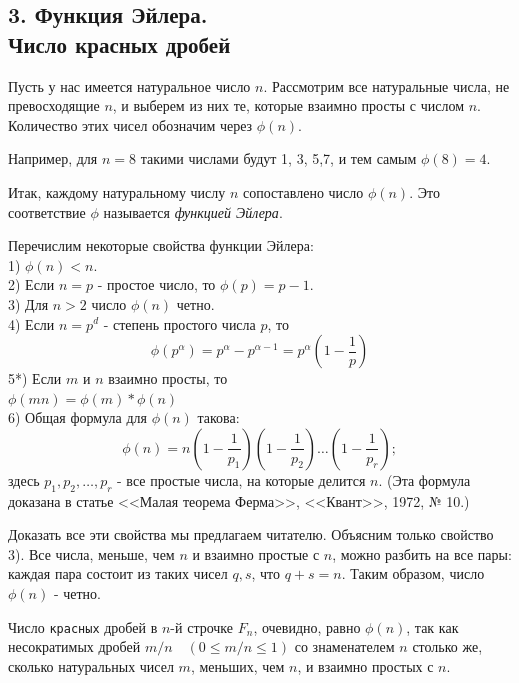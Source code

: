\begin{multicols*}{2}
\section*{3. Функция Эйлера.\\Число красных дробей}
{\large
Пусть у нас имеется натуральное число $n$. Рассмотрим все натуральные числа, не превосходящие $n$, и выберем из них те, которые взаимно просты с числом $n$. Количество этих чисел обозначим через $\phi(n)$.

Например, для $n=8$ такими числами будут 1, 3, 5,7, и тем самым $\phi(8)=4$.

Итак, каждому натуральному числу $n$ сопоставлено число $\phi(n)$. Это соответствие $\phi$ называется \textit{функцией Эйлера}.

Перечислим некоторые свойства функции Эйлера:\\
1) $\phi(n) < n$.\\
2) Если $n = p$ - простое число, то $\phi(p) = p - 1$.\\
3) Для $n > 2$ число $\phi(n)$ четно.\\
4) Если $n = p^d$ - степень простого числа $p$, то
\[
\phi(p^\alpha) = p^\alpha - p^{\alpha-1} = p^\alpha\left(1 - \frac{1}{p}\right)
\]
5*) Если $m$ и $n$ взаимно просты, то\\ $\phi(mn) = \phi(m)*\phi(n)$\\
6) Общая формула для $\phi(n)$ такова:
\[
\phi(n) = n\left(1 - \frac{1}{p_1}\right)\left(1 - \frac{1}{p_2}\right)\dots\left(1 - \frac{1}{p_r}\right);
\]
здесь $p_1, p_2, \dots, p_r$ - все простые числа, на которые делится $n$. (Эта формула доказана в статье <<Малая теорема Ферма>>, <<Квант>>, 1972, № 10.)

Доказать все эти свойства мы предлагаем читателю. Объясним только свойство 3). Все числа, меньше, чем $n$ и взаимно простые с $n$, можно разбить на все пары: каждая пара состоит из таких чисел $q, s$, что $q+s=n$. Таким образом, число $\phi(n)$ - четно.

Число \texttt{красных} дробей в $n$-й строчке $F_n$, очевидно, равно $\phi(n)$, так как несократимых дробей $m/n\quad (0\le m/n\le 1)$ со знаменателем $n$ столько же, сколько натуральных чисел $m$, меньших, чем $n$, и взаимно простых с $n$.

}
\end{multicols*}
